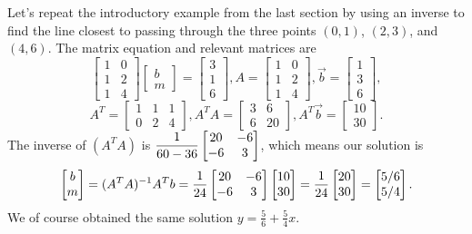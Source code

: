 \begin{example}
Let's repeat the introductory example from the last section by using an inverse to find the line closest to passing through the three points $(0,1)$, $(2,3)$, and $(4,6)$. The matrix equation and relevant matrices are
$$\begin{bmatrix}1&0\\1&2\\1&4\end{bmatrix}
\begin{bmatrix}b\\m\end{bmatrix}
=\begin{bmatrix}3\\1\\6\end{bmatrix},
A = \begin{bmatrix}1&0\\1&2\\1&4\end{bmatrix},
\vec b = \begin{bmatrix}1\\3\\6\end{bmatrix}, $$$$
A^T= \begin{bmatrix}1&1&1\\0&2&4\end{bmatrix}, 
A^T A= \begin{bmatrix}3&6\\6&20\end{bmatrix}, 
A^T\vec b = \begin{bmatrix}10\\30\end{bmatrix}.
$$
The inverse of $(A^TA)$ is $\displaystyle\frac{1}{60-36}\begin{bmatrix}20&-6\\-6&3\end{bmatrix}$, which means our solution is 
$$
\begin{bmatrix}b\\m\end{bmatrix} 
= (A^TA)^{-1}A^T b 
= \displaystyle\frac{1}{24}\begin{bmatrix}20&-6\\-6&3\end{bmatrix}\begin{bmatrix}10\\30\end{bmatrix}
= \displaystyle\frac{1}{24}\begin{bmatrix}20\\30\end{bmatrix}  
= \begin{bmatrix}5/6\\5/4\end{bmatrix}. 
$$
We of course obtained the same solution $y=\frac{5}{6}+\frac{5}{4}x$.
\end{example}


